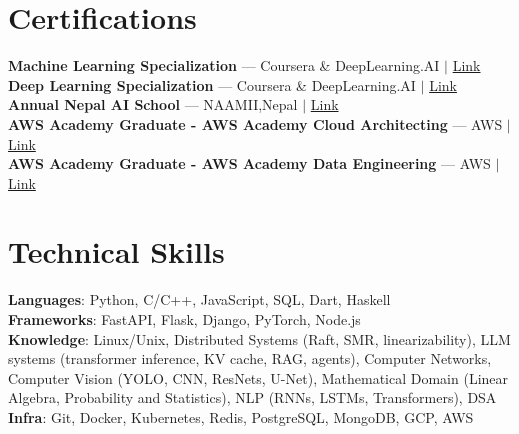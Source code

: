 \documentclass[letterpaper,11pt]{article}
\begin{document}
 \section{Certifications}
 \begin{itemize}[leftmargin=0.15in, label={}, itemsep=1pt, parsep=0pt, topsep=1pt]
    \small{\item{
     \textbf{Machine Learning Specialization} --- Coursera \& DeepLearning.AI $|$ \href{https://www.coursera.org/account/accomplishments/specialization/certificate/UCBXAJSNHGZT}{Link} \\
     \textbf{Deep Learning Specialization}  --- Coursera \& DeepLearning.AI $|$ \href{https://www.coursera.org/account/accomplishments/specialization/certificate/UCBXAJSNHGZT}{Link}\\
     \textbf{Annual Nepal AI School} --- NAAMII,Nepal $|$ \href{https://drive.google.com/file/d/15_pX-sWftYpIucRH2JgwiGVqRODABdjE/view?usp=sharing}{Link}  \\
     \textbf{AWS Academy Graduate - AWS Academy Cloud Architecting} --- AWS $|$ \href{https://www.credly.com/badges/6e20049c-2d60-4e8e-b8df-80c5c2185a11/linked_in_profile}{Link}\\
     \textbf{AWS Academy Graduate - AWS Academy Data Engineering} --- AWS $|$ \href{https://drive.google.com/file/d/1Bd9PVuHlZdQLId6qMDCBYZ_S0cNnpoNK/view?usp=sharing}{Link}\\
    }}
 \end{itemize}

\section{Technical Skills}
 \begin{itemize}[leftmargin=0.15in, label={}, itemsep=1pt, parsep=0pt, topsep=1pt]
    \small{\item{
     \textbf{Languages}{: Python, C/C++, JavaScript, SQL, Dart, Haskell} \\
     \textbf{Frameworks}{: FastAPI, Flask, Django, PyTorch, Node.js} \\
     \textbf{Knowledge}{: Linux/Unix, Distributed Systems (Raft, SMR, linearizability), LLM systems (transformer inference, KV cache, RAG, agents), Computer Networks, Computer Vision (YOLO, CNN, ResNets, U-Net), Mathematical Domain (Linear Algebra, Probability and Statistics), NLP (RNNs, LSTMs, Transformers), DSA} \\
     \textbf{Infra}{: Git, Docker, Kubernetes, Redis, PostgreSQL, MongoDB, GCP, AWS} \\
    }}
 \end{itemize}
\end{document}
